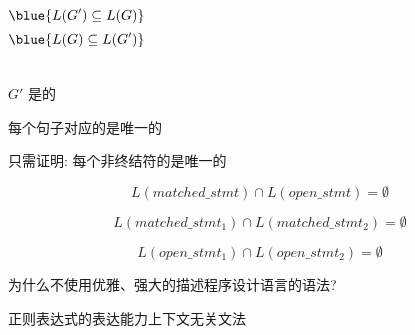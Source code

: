 \begin{frame}{}
  \begin{center}


    \pause
    \begin{columns}
        \[
          \blue{L(G') \subseteq L(G)}
        \]
        \[
          \blue{L(G) \subseteq L(G')}
        \]
        \pause
        \vspace{-0.60cm}
        \begin{center}
        \end{center}
    \end{columns}
  \end{center}
\end{frame}

\begin{frame}{}
  \begin{center}
    $G'$ 是的

    \pause
    \vspace{0.20cm}
    每个句子对应的是唯一的

    \pause
    \vspace{0.30cm}
    只需证明: 每个非终结符的是唯一的

    \pause
    \[
      L(matched\_stmt) \cap L(open\_stmt) = \emptyset
    \]

    \pause
    \vspace{-0.50cm}
    \[
      L(matched\_stmt_{1}) \cap L(matched\_stmt_{2}) = \emptyset
    \]

    \pause
    \vspace{-0.50cm}
    \[
      L(open\_stmt_{1}) \cap L(open\_stmt_{2}) = \emptyset
    \]
  \end{center}
\end{frame}

\begin{frame}{}
  \begin{center}
    为什么不使用优雅、强大的描述程序设计语言的语法?

    \vspace{0.50cm}
    正则表达式的表达能力上下文无关文法
  \end{center}
\end{frame}

